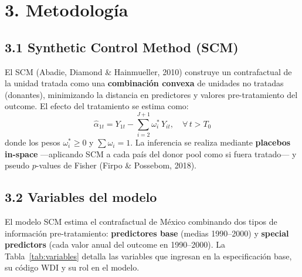 \documentclass[11pt,a4paper]{article}
\begin{document}
\section*{3. Metodología}

\subsection*{3.1 Synthetic Control Method (SCM)}

El SCM (Abadie, Diamond \& Hainmueller, 2010) construye un contrafactual de la unidad tratada como una \textbf{combinación convexa} de unidades no tratadas (donantes), minimizando la distancia en predictores y valores pre-tratamiento del outcome. El efecto del tratamiento se estima como:
\[
\hat{\alpha}_{1t} = Y_{1t} - \sum_{i=2}^{J+1} \omega_i^* \, Y_{it}, \quad \forall \, t > T_0
\]
donde los pesos $\omega_i^* \geq 0$ y $\sum \omega_i = 1$. La inferencia se realiza mediante \textbf{placebos in-space} —aplicando SCM a cada país del donor pool como si fuera tratado— y pseudo $p$-values de Fisher (Firpo \& Possebom, 2018).

\subsection*{3.2 Variables del modelo}

El modelo SCM estima el contrafactual de México combinando dos tipos de información pre-tratamiento: \textbf{predictores base} (medias 1990–2000) y \textbf{special predictors} (cada valor anual del outcome en 1990–2000). La Tabla~\ref{tab:variables} detalla las variables que ingresan en la especificación base, su código WDI y su rol en el modelo.
\end{document}
